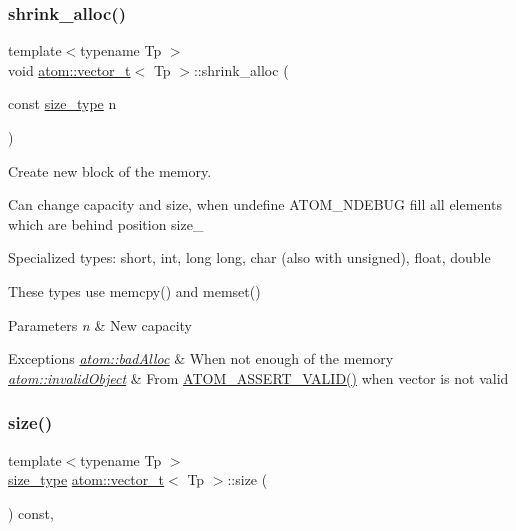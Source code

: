 \subsubsection{\texorpdfstring{shrink\+\_\+alloc()}{shrink\_alloc()}}
{\footnotesize\ttfamily template$<$typename Tp $>$ \\
void \hyperlink{classatom_1_1vector__t}{atom\+::vector\+\_\+t}$<$ Tp $>$\+::shrink\+\_\+alloc (\begin{DoxyParamCaption}\item[{const \hyperlink{classatom_1_1vector__t_a1790d79321f4fa8d2580474dd0f56033}{size\+\_\+type}}]{n }\end{DoxyParamCaption})\hspace{0.3cm}{\ttfamily [private]}}



Create new block of the memory. 

Can change capacity and size, when undefine A\+T\+O\+M\+\_\+\+N\+D\+E\+B\+UG fill all elements which are behind position size\+\_\+

Specialized types\+: short, int, long long, char (also with unsigned), float, double

These types use memcpy() and memset() 
\begin{DoxyParams}{Parameters}
{\em n} & New capacity \\
\hline
\end{DoxyParams}

\begin{DoxyExceptions}{Exceptions}
{\em \hyperlink{classatom_1_1bad_alloc}{atom\+::bad\+Alloc}} & When not enough of the memory \\
\hline
{\em \hyperlink{classatom_1_1invalid_object}{atom\+::invalid\+Object}} & From \hyperlink{debug__tools_8h_a273b49426c51bc6a7eb989ee0acbdc6b}{A\+T\+O\+M\+\_\+\+A\+S\+S\+E\+R\+T\+\_\+\+V\+A\+L\+I\+D()} when vector is not valid \\
\hline
\end{DoxyExceptions}
\mbox{\label{classatom_1_1vector__t_ad81b85532451986356b3b244aa1b77e7}} 
\subsubsection{\texorpdfstring{size()}{size()}}
{\footnotesize\ttfamily template$<$typename Tp $>$ \\
\hyperlink{classatom_1_1vector__t_a1790d79321f4fa8d2580474dd0f56033}{size\+\_\+type} \hyperlink{classatom_1_1vector__t}{atom\+::vector\+\_\+t}$<$ Tp $>$\+::size (\begin{DoxyParamCaption}{ }\end{DoxyParamCaption}) const\hspace{0.3cm}{\ttfamily [inline]}, {\ttfamily [noexcept]}}



